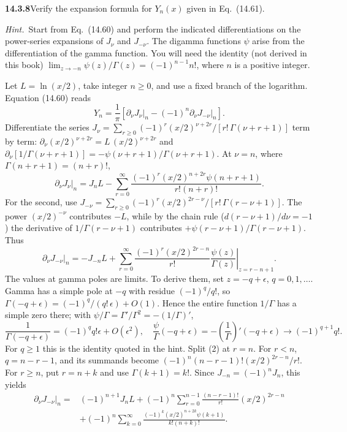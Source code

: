 \par\bigskip
\noindent\textbf{14.3.8}\quad Verify the expansion formula for $Y_{n}(x)$
given in Eq.~(14.61).
\par\emph{Hint.}~Start from Eq.~(14.60) and perform the indicated
differentiations on the power-series expansions of $J_{\nu}$ and
$J_{-\nu}$. The digamma functions $\psi$ arise from the
differentiation of the gamma function. You will need the identity (not
derived in this book)
$\displaystyle\lim_{z\to-n}\psi(z)/\Gamma(z)=(-1)^{n-1}n!$, where $n$
is a positive integer.
\par{}
\solution
Let $L=\ln(x/2)$, take integer $n\ge0$, and use a fixed
branch of the logarithm. Equation (14.60) reads
\[
Y_n=\frac1\pi\left[
\left.\partial_\nu J_\nu\right|_n
-(-1)^n\left.\partial_\nu J_{-\nu}\right|_n\right].
\]
Differentiate the series
$J_\nu=\sum_{r\ge0}(-1)^r(x/2)^{\nu+2r}/[r!\,\Gamma(\nu+r+1)]$ term by
term: $\partial_\nu(x/2)^{\nu+2r}=L\,(x/2)^{\nu+2r}$ and
$\partial_\nu[1/\Gamma(\nu+r+1)]=-\psi(\nu+r+1)/\Gamma(\nu+r+1)$.
At $\nu=n$, where $\Gamma(n+r+1)=(n+r)!$,
\[
\left.\partial_\nu J_\nu\right|_n
=J_nL-\sum_{r=0}^\infty
\frac{(-1)^r(x/2)^{n+2r}\psi(n+r+1)}{r!(n+r)!}.
\tag{1}
\]
For the second, use
$J_{-\nu}=\sum_{r\ge0}(-1)^r(x/2)^{2r-\nu}/[r!\,\Gamma(r-\nu+1)]$.
The power $(x/2)^{-\nu}$ contributes $-L$, while by the chain rule
($d(r-\nu+1)/d\nu=-1$) the derivative of $1/\Gamma(r-\nu+1)$
contributes $+\psi(r-\nu+1)/\Gamma(r-\nu+1)$. Thus
\[
\left.\partial_\nu J_{-\nu}\right|_n
=-J_{-n}L+\sum_{r=0}^\infty
\frac{(-1)^r(x/2)^{2r-n}}{r!}
\left.\frac{\psi(z)}{\Gamma(z)}\right|_{z=r-n+1}.
\tag{2}
\]
The values at gamma poles are limits. To derive them, set
$z=-q+\epsilon$, $q=0,1,\ldots$. Gamma has a simple pole at $-q$
with residue $(-1)^q/q!$, so $\Gamma(-q+\epsilon)=(-1)^q/(q!\,\epsilon)
+O(1)$. Hence the entire function $1/\Gamma$ has a simple zero there;
with $\psi/\Gamma=\Gamma'/\Gamma^2=-(1/\Gamma)'$,
\[
\frac1{\Gamma(-q+\epsilon)}=(-1)^q q!\epsilon+O(\epsilon^2),
\quad
\frac\psi\Gamma(-q+\epsilon)=-\left(\frac1\Gamma\right)'(-q+\epsilon)
\longrightarrow(-1)^{q+1}q!.
\]
For $q\ge1$ this is the identity quoted in the hint.
Split (2) at $r=n$. For $r<n$, $q=n-r-1$, and its summands
become $(-1)^n(n-r-1)!(x/2)^{2r-n}/r!$. For $r\ge n$,
put $r=n+k$ and use $\Gamma(k+1)=k!$. Since
$J_{-n}=(-1)^nJ_n$, this yields
\begin{align*}
\left.\partial_\nu J_{-\nu}\right|_n
={}&(-1)^{n+1}J_nL
+(-1)^n\sum_{r=0}^{n-1}\frac{(n-r-1)!}{r!}(x/2)^{2r-n}\\
&+(-1)^n\sum_{k=0}^\infty
\frac{(-1)^k(x/2)^{n+2k}\psi(k+1)}{k!(n+k)!}.
\end{align*}

